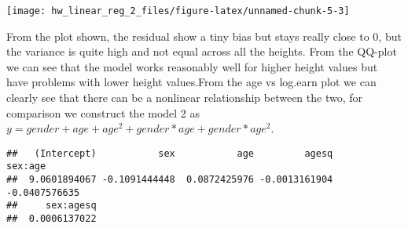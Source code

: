 \documentclass[]{article}
\newenvironment{Shaded}{\begin{snugshade}}{\end{snugshade}}
\newcommand{\CommentTok}[1]{\textcolor[rgb]{0.56,0.35,0.01}{\textit{#1}}}
\newcommand{\DataTypeTok}[1]{\textcolor[rgb]{0.13,0.29,0.53}{#1}}
\newcommand{\DecValTok}[1]{\textcolor[rgb]{0.00,0.00,0.81}{#1}}
\newcommand{\KeywordTok}[1]{\textcolor[rgb]{0.13,0.29,0.53}{\textbf{#1}}}
\newcommand{\NormalTok}[1]{#1}
\newcommand{\OperatorTok}[1]{\textcolor[rgb]{0.81,0.36,0.00}{\textbf{#1}}}
\newcommand{\StringTok}[1]{\textcolor[rgb]{0.31,0.60,0.02}{#1}}
\begin{document}
\begin{center}\texttt{[image: hw\_linear\_reg\_2\_files/figure-latex/unnamed-chunk-5-3]} \end{center}

From the plot shown, the residual show a tiny bias but stays really
close to 0, but the variance is quite high and not equal across all the
heights. From the QQ-plot we can see that the model works reasonably
well for higher height values but have problems with lower height
values.\newline From the age vs log.earn plot we can clearly see that
there can be a nonlinear relationship between the two, for comparison we
construct the model 2 as
\(y = gender + age + age^2 + gender * age + gender * age^2\). \newline

\begin{Shaded}
\end{Shaded}

\begin{verbatim}
##   (Intercept)           sex           age         agesq       sex:age 
##  9.0601894067 -0.1091444448  0.0872425976 -0.0013161904 -0.0407576635 
##     sex:agesq 
##  0.0006137022
\end{verbatim}

\begin{Shaded}
\end{Shaded}
\end{document}
